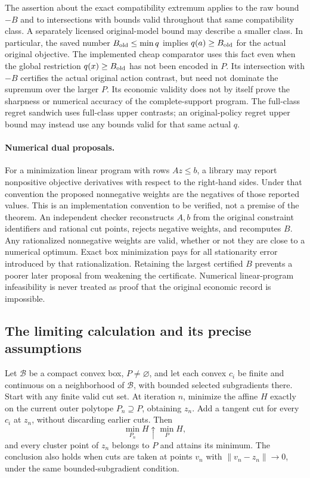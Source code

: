 The assertion about the exact compatibility extremum applies to the
raw bound $-B$ and to intersections with bounds valid throughout that
same compatibility class. A separately licensed original-model bound
may describe a smaller class. In particular, the saved number
$B_{\rm old}\le\min q$ implies $q(a)\ge B_{\rm old}$ for the
actual original objective. The implemented cheap comparator uses this
fact even when the global restriction $q(x)\ge B_{\rm old}$ has
not been encoded in $P$. Its intersection with $-B$ certifies the
actual original action contrast, but need not dominate the supremum
over the larger $P$. Its economic validity does not by itself prove
the sharpness or numerical accuracy of the complete-support program.
The full-class regret sandwich uses full-class upper contrasts;
an original-policy regret upper bound may instead use any bounds
valid for that same actual $q$.

\paragraph{Numerical dual proposals.}
For a minimization linear program with rows $Az\le b$, a library may
report nonpositive objective derivatives with respect to the right-hand
sides. Under that convention the proposed nonnegative weights are
the negatives of those reported values. This is an implementation
convention to be verified, not a premise of the theorem. An independent
checker reconstructs $A,b$ from the original constraint identifiers
and rational cut points, rejects negative weights, and recomputes $B$.
Any rationalized nonnegative weights are valid, whether or not they
are close to a numerical optimum. Exact box minimization pays for all
stationarity error introduced by that rationalization. Retaining the
largest certified $B$ prevents a poorer later proposal from weakening
the certificate. Numerical linear-program infeasibility is never
treated as proof that the original economic record is impossible.

\subsection{The limiting calculation and its precise assumptions}

\begin{proposition}
\label{prop:outerlimit126}
Let $\mathcal B$ be a compact convex box, $P\ne\varnothing$, and
let each convex $c_i$ be finite and continuous on a neighborhood of
$\mathcal B$, with bounded selected subgradients there. Start with
any finite valid cut set. At iteration $n$, minimize the affine
$H$ exactly on the current outer polytope $P_n\supseteq P$,
obtaining $z_n$. Add a tangent cut for every $c_i$ at $z_n$,
without discarding earlier cuts. Then
\[
 \min_{P_n}H\uparrow\min_PH,
\]
and every cluster point of $z_n$ belongs to $P$ and attains its
minimum. The conclusion also holds when cuts are taken at points
$v_n$ with $\|v_n-z_n\|\to0$, under the same bounded-subgradient
condition.
\end{proposition}

